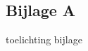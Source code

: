 \begin{appendices}
\section*{Bijlage A }
\label{att:installation}
toelichting bijlage
\end{appendices}
